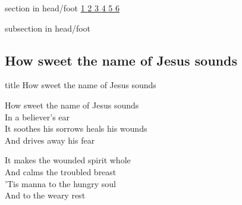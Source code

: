 \documentclass[aspectratio=169]{beamer}
\begin{document}
{
{ 
 {
 \begin{beamercolorbox}[ht=4.5ex,dp=1.5ex,%
      leftskip=.3cm,rightskip=.3cm plus1fil]{section in head/foot}
 \fontsize{12}{25}\selectfont 
\hyperlink{How sweet the name of Jesus sounds[]1}{1  }\hyperlink{How sweet the name of Jesus sounds[]2}{2  }\hyperlink{How sweet the name of Jesus sounds[]3}{3  }\hyperlink{How sweet the name of Jesus sounds[]4}{4  }\hyperlink{How sweet the name of Jesus sounds[]5}{5  }\hyperlink{How sweet the name of Jesus sounds[]6}{6  } 
 \end{beamercolorbox}%
  \begin{beamercolorbox}[ht=2.5ex,dp=1.125ex,%
   leftskip=.3cm,rightskip=.3cm plus1fil]{subsection in head/foot}
   \insertauthor
 \end{beamercolorbox}%
 }
}
\subsection{How sweet the name of Jesus sounds}
\hypertarget{How sweet the name of Jesus sounds[]}{}
\begin{frame}{}
 \vfill
  \centering
  \begin{beamercolorbox}[sep=8pt,center,shadow=true,rounded=true]{title}
    How sweet the name of Jesus sounds     
  \end{beamercolorbox}
  \vfill
\end{frame}

\hypertarget{How sweet the name of Jesus sounds[]1}{}
\begin{frame}{}
\fontsize{23.076923076923077}{27.69230769230769}\selectfont

How sweet the name of Jesus sounds\\ 
In a believer's ear\\ 
It soothes his sorrows heals his wounds\\ 
And drives away his fear

\end{frame}
\hypertarget{How sweet the name of Jesus sounds[]2}{}
\begin{frame}{}
\fontsize{23.076923076923077}{27.69230769230769}\selectfont

It makes the wounded spirit whole\\ 
And calms the troubled breast\\ 
'Tis manna to the hungry soul\\ 
And to the weary rest


\end{frame}}
\end{document}
